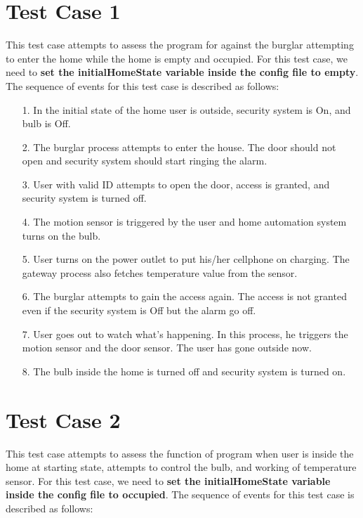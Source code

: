 \documentclass[12pt]{article}
\begin{document}
\section{Test Case 1}
This test case attempts to assess the program for against the burglar attempting to 
enter the home while the home is empty and occupied. For this test case, we need to \textbf{set the initialHomeState variable inside the config file to empty}. The sequence of events for this 
test case is described as follows:

\begin{itemize}
	\item[1.] In the initial state of the home user is outside, security system is On, and bulb is Off.
	
	\item[2.] The burglar process attempts to enter the house. The door should not open and security system should start ringing the alarm. 
	
	\item[3.] User with valid ID attempts to open the door, access is granted, and security system is turned off. 
	
	\item[4.] The motion sensor is triggered by the user and home automation system turns on the bulb. 
	
	\item[5.] User turns on the power outlet to put his/her cellphone on charging. The gateway 
	process also fetches temperature value from the sensor.
	
	\item[6.] The burglar attempts to gain the access again. The access is not granted even if the security system is Off but the alarm go off. 
	
	\item[7.] User goes out to watch what's happening. In this process, he triggers the motion 
	sensor and the door sensor. The user has gone outside now. 
	
	\item[8.] The bulb inside the home is turned off and security system is turned on. 
	
\end{itemize}


\section{Test Case 2}

This test case attempts to assess the function of program when user is inside the home at starting state, attempts to control the bulb, and working of temperature sensor. For this test case, we need to \textbf{set the initialHomeState variable inside the config file to occupied}. The sequence of events for this test case is described as follows:
\end{document}
